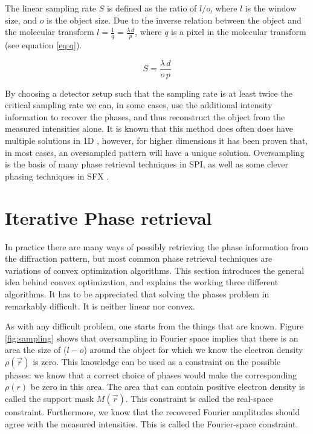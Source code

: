 The linear sampling rate $S$ is defined as the ratio of $l/o$, where $l$ is the window size, and $o$ is the object size. Due to the inverse relation between the object and the molecular transform $l = \frac{1}{q} = \frac{\lambda\, d}{p}$, where $q$ is a pixel in the molecular transform (see equation \ref{eq:q}). 

\begin{equation}
S = \frac{\lambda\,d}{o\,p}
\end{equation}

By choosing a detector setup such that the sampling rate is at least twice the critical sampling rate we can, in some cases, use the additional intensity information to recover the phases, and thus reconstruct the object from the measured intensities alone. It is known that this method does often does have multiple solutions in 1D \cite{Walther1963}, however, for higher dimensions it has been proven that, in most cases, an oversampled pattern will have a unique solution\cite{Bruck1979}. Oversampling is the basis of many phase retrieval techniques in SPI, as well as some clever phasing techniques in SFX \cite{Ayyer2016,Chapman2011}.

\section{Iterative Phase retrieval}
In practice there are many ways of possibly retrieving the phase information from the diffraction pattern, but most common phase retrieval techniques are variations of convex optimization algorithms. This section introduces the general idea behind convex optimization, and explains the working three different algorithms. It has to be appreciated that solving the phases problem in remarkably difficult. It is neither linear nor convex.

As with any difficult problem, one starts from the things that are known. Figure \ref{fig:sampling} shows that oversampling in Fourier space implies that there is an area the size of ($l-o$) around the object for which we know the electron density $\rho(\vec{r})$ is zero. This knowledge can be used as a constraint on the possible phases: we know that a correct choice of phases would make the corresponding $\rho(r)$ be zero in this area. The area that can contain positive electron density is called the support mask $M(\vec{r})$. This constraint is called the real-space constraint. Furthermore, we know that the recovered Fourier amplitudes should agree with the measured intensities. This is called the Fourier-space constraint. 


